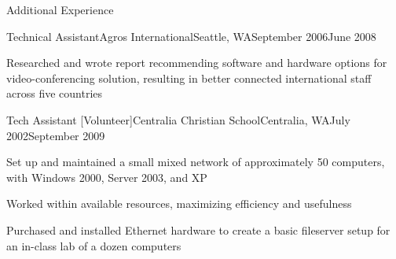\documentclass[letterpaper,10pt]{article}
\newcommand{\optarg}[2][]{%
  \ifthenelse{\isempty{#1}}%
    {}%
    {#2}%
}
\newenvironment{res_section}[1]{%
  \vskip 6pt
  \noindent
  {\Large \textbf{#1}}\\
  \rule[8pt]{\textwidth}{0.5pt}
  \vskip -8pt
}{
}
\newenvironment{res_subsection}[1]{%
  \vskip 4pt
  \noindent
  \textbf{\large{#1}}
  \begin{itemize}
}{
  \end{itemize}
}
\newenvironment{res_experienceitem}[5]{%
  \begin{res_subsection}{#1 - \em{%
  #2%
  \optarg[#3]{, #3}%
  \optarg[#4]{, #4}%
  \optarg[#5]{ -- #5}%
  }}
}{
  \end{res_subsection}
}
\begin{document}
\begin{res_section}{Additional Experience}
\begin{res_experienceitem}{Technical Assistant}{Agros International}{Seattle, WA}{September 2006}{June 2008}
  \item Researched and wrote report recommending software and hardware options for video-conferencing solution, resulting in better connected international staff across five countries
\end{res_experienceitem}
\begin{res_experienceitem}{Tech Assistant [Volunteer]}{Centralia Christian School}{Centralia, WA}{July 2002}{September 2009}
  \item Set up and maintained a small mixed network of approximately 50 computers, with Windows 2000, Server 2003, and XP
  \item Worked within available resources, maximizing efficiency and usefulness
  \item Purchased and installed Ethernet hardware to create a basic fileserver setup for an in-class lab of a dozen computers
\end{res_experienceitem}
\end{res_section}
\end{document}
